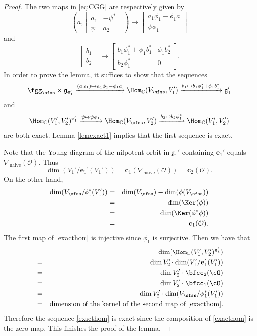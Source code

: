 \documentclass[11pt,a4paper]{amsart}
\newcommand{\CO}{{\mathcal {O}}}
\newcommand{\g}{\mathfrak g}
\newcommand{\be}{\begin {equation}}
\newcommand{\ee}{\end {equation}}
\numberwithin{equation}{section}
\theoremstyle{remark}
\begin{document}
\begin{proof}
The two maps in \eqref{eq:CGG} are respectively given by
\[
  \left(a, \begin{bmatrix}
        a_1 & -\psi^*\\
        \psi & a_2
      \end{bmatrix}\right)\mapsto   \begin{bmatrix}
        a_1 \phi_1-\phi_1 a\\
        \psi \phi_1
      \end{bmatrix}
\]
and
\[
  \begin{bmatrix}
       b_1\\
       b_2
      \end{bmatrix}\mapsto   \begin{bmatrix}
       b_1 \phi_1^*+\phi_1 b_1^*  & \phi_1 b_2^*\\
        b_2 \phi_1^* & 0
      \end{bmatrix}.
\]
In order to prove the lemma, it suffices to show that the sequences
 \[
  \fggs\times  \g_{\mathbf e_1'} \xrightarrow{(a,a_1)\mapsto  a_1 \phi_1-\phi_1 a } \Hom_\C(V_\sfss, V_1')
  \xrightarrow{b_1\mapsto  b_1\phi_1^{*}+\phi_1 b_1^{*} } \g_1'
  \]
and
\be\label{exacthom}
  \Hom_\C(V_1', V_2')^{\mathbf e_1'} \xrightarrow{\psi \mapsto  \psi \phi_1 } \Hom_\C(V_\sfss, V_2')
  \xrightarrow{b_2\mapsto  b_2\phi_1^{*}}  \Hom_\C(V_1', V_2')
\ee
are both exact. Lemma \ref{lemexact1} implies that the first sequence is exact.

Note that the Young diagram of the nilpotent orbit in $\g_1'$ containing $\mathbf e_1'$ equals $\nabla_{\mathrm{naive}}(\CO)$. Thus
\[
  \dim (V_1'/\mathbf e_1'(V_1'))=\mathbf c_1(\nabla_{\mathrm{naive}}(\CO))=\mathbf c_2(\CO).
\]
On the other hand,
\begin{eqnarray*}
  \dim (V_{\sfss}/\phi_1^*(V_1'))&=&\dim (V_{\sfss})-\dim (\phi(V_{\sfss}))\\
  &=&\dim(\Ker(\phi))\\
  &=&\dim(\Ker(\phi^*\phi))\\
  &=&\mathbf c_1(\CO).
\end{eqnarray*}
The first map of \eqref{exacthom} is injective since $\phi_1$ is surjective. Then we have that
\begin{eqnarray*}
     && \dim ( \Hom_\C(V_1', V_2')^{\mathbf e_1'} ) \\
      &=& \dim V_2' \cdot \dim (V_1'/\mathbf e_1'(V_1'))\\
      & = &\dim V_2' \cdot  \bfcc_{2}(\cO)\\
      & = &\dim V_2' \cdot  \bfcc_{1}(\cO)\\
        & = &\dim V_2' \cdot  \dim (V_{\sfss}/\phi_1^*(V_1'))\\
        &=& \textrm{dimension of the kernel of the second map of  \eqref{exacthom}}.
    \end{eqnarray*}
Therefore the sequence \eqref{exacthom} is exact since the composition of  \eqref{exacthom} is the zero map. This finishes the proof of the lemma.
\end{proof}
\end{document}
